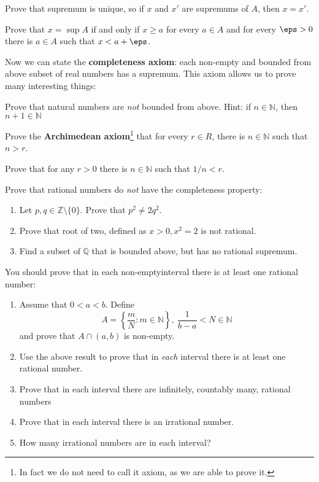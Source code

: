 \begin{prob}
  Prove that supremum is unique, so if $x$ and $x'$ are supremums
  of $A$, then $x=x'$.
\end{prob}

\begin{prob}
  Prove that $x=\sup A$ if and only if
  $x\ge a$ for every $a\in A$ and for every $\eps > 0$ there is
  $a\in A$ such that $x < a + \eps$.
\end{prob}

\noindent Now we can state the \textbf{completeness axiom}:
each non-empty and bounded from above subset of real numbers has
a supremum.
This axiom allows us to prove many interesting things:

\begin{prob}
  Prove that natural numbers are \textit{not} bounded from above.
  Hint: if $n\in \mathbb N$, then $n+1\in \mathbb N$
\end{prob}

\begin{prob}
  Prove the \textbf{Archimedean axiom}\footnote{In fact we do not
  need to call it axiom, as we are able to prove it.}
  that for every $r\in R$, there is $n\in \mathbb N$ such that $n>r$.
\end{prob}

\begin{prob}
  Prove that for any $r>0$ there is $n\in \mathbb N$ such that
  $1/n < r$.
\end{prob}

\begin{prob}
  Prove that rational numbers do \textit{not} have the completeness
  property:
  \begin{enumerate}
    \item Let $p, q\in \mathbb Z\setminus \{0\}$.
      Prove that $p^2\neq 2q^2$.
    \item Prove that root of two, defined as
      $x > 0, x^2=2$ is not rational.
    \item Find a subset of $\mathbb Q$ that is bounded above, but
      has no rational supremum.
  \end{enumerate}
\end{prob}

\begin{prob}
  You should prove that in each non-emptyinterval there is at least
  one rational number:
  \begin{enumerate}
    \item Assume that $0<a<b$. Define
      $$A=\left\{\frac m N : m\in \mathbb N\right\},~
      \frac 1{b-a} < N \in \mathbb N$$
      and prove that $A\cap (a,b)$ is non-empty.
    \item Use the above result to prove that in \textit{each}
      interval there is at least one rational number.
    \item Prove that in each interval there are infinitely,
    countably many, rational numbers
    \item Prove that in each interval there is an irrational number.
    \item How many irrational numbers are in each interval?
  \end{enumerate}
\end{prob}

